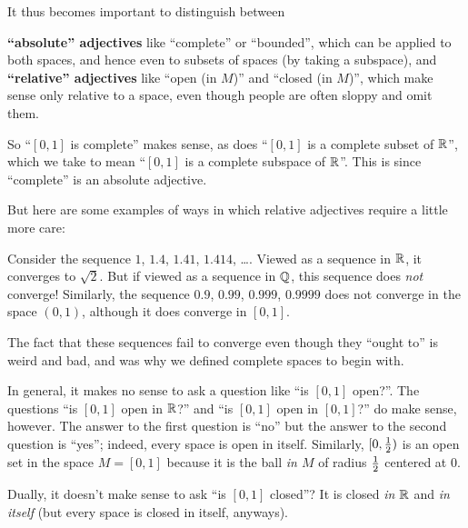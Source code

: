It thus becomes important to distinguish between
\begin{enumerate}[(i)]
	\ii \textbf{``absolute'' adjectives} like ``complete'' or ``bounded'',
	which can be applied to both spaces,
	and hence even to subsets of spaces (by taking a subspace),
	and
	\ii \textbf{``relative'' adjectives}
	like ``open (in $M$)'' and ``closed (in $M$)'',
	which make sense only relative to a space,
	even though people are often sloppy and omit them.
\end{enumerate}
So ``$[0,1]$ is complete'' makes sense,
as does ``$[0,1]$ is a complete subset of $\mathbb R$'',
which we take to mean ``$[0,1]$ is a complete subspace of $\mathbb R$''.
This is since ``complete'' is an absolute adjective.

But here are some examples of ways in which relative adjectives
require a little more care:
\begin{itemize}
	\ii Consider the sequence $1$, $1.4$, $1.41$, $1.414$, \dots.
	Viewed as a sequence in $\mathbb R$, it converges to $\sqrt 2$.
	But if viewed as a sequence in $\mathbb Q$,
	this sequence does \emph{not} converge!
	Similarly, the sequence $0.9$, $0.99$, $0.999$, $0.9999$
	does not converge in the space $(0,1)$,
	although it does converge in $[0,1]$.

	The fact that these sequences fail to converge
	even though they ``ought to'' is weird and bad,
	and was why we defined complete spaces to begin with.

	\ii In general, it makes no sense to ask a question like ``is $[0,1]$ open?''.
	The questions ``is $[0,1]$ open in $\mathbb R$?''
	and ``is $[0,1]$ open in $[0,1]$?'' do make sense, however.
	The answer to the first question is ``no''
	but the answer to the second question is ``yes'';
	indeed, every space is open in itself.
	Similarly, $[0, \frac{1}{2})$ is an open set %
	in the space $M = [0,1]$
	because it is the ball \emph{in $M$}
	of radius $\frac{1}{2}$ centered at $0$.

	\ii Dually, it doesn't make sense to ask ``is $[0,1]$ closed''?
	It is closed \emph{in $\mathbb R$} and \emph{in itself}
	(but every space is closed in itself, anyways).
\end{itemize}


